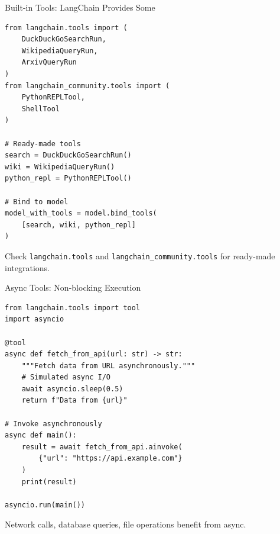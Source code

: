 \documentclass[aspectratio=169,11pt]{beamer}
\begin{document}
\begin{frame}[fragile,shrink=2]{Built-in Tools: LangChain Provides Some}
\begin{codebox}
\begin{lstlisting}
from langchain.tools import (
    DuckDuckGoSearchRun,
    WikipediaQueryRun,
    ArxivQueryRun
)
from langchain_community.tools import (
    PythonREPLTool,
    ShellTool
)

# Ready-made tools
search = DuckDuckGoSearchRun()
wiki = WikipediaQueryRun()
python_repl = PythonREPLTool()

# Bind to model
model_with_tools = model.bind_tools(
    [search, wiki, python_repl]
)
\end{lstlisting}
\end{codebox}

\begin{tipbox}[Discovery]
Check \texttt{langchain.tools} and \texttt{langchain\_community.tools} for ready-made integrations.
\end{tipbox}
\end{frame}

\begin{frame}[fragile,shrink=2]{Async Tools: Non-blocking Execution}
\begin{codebox}
\begin{lstlisting}
from langchain.tools import tool
import asyncio

@tool
async def fetch_from_api(url: str) -> str:
    """Fetch data from URL asynchronously."""
    # Simulated async I/O
    await asyncio.sleep(0.5)
    return f"Data from {url}"

# Invoke asynchronously
async def main():
    result = await fetch_from_api.ainvoke(
        {"url": "https://api.example.com"}
    )
    print(result)

asyncio.run(main())
\end{lstlisting}
\end{codebox}

\begin{tipbox}
Network calls, database queries, file operations benefit from async.
\end{tipbox}
\end{frame}
\end{document}
